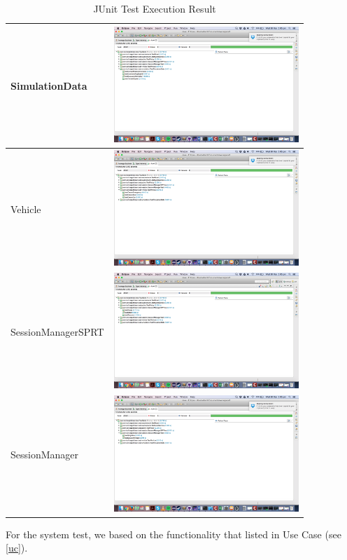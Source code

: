 \documentclass[11pt]{article}
\begin{document}
\begin{center}
\begin{table}[H]
\begin{tabular}{|m{7cm}|m{7cm}|}
		 SimulationData & \includegraphics[width=7cm]{TestSimulationData}\\ \hline
		 Vehicle & \includegraphics[width=7cm]{TestVehicle}\\ \hline
		 SessionManagerSPRT & \includegraphics[width=7cm]{SessionManagerSPRTest}\\ \hline
		 SessionManager & \includegraphics[width=7cm]{SessionManagerTest}\\ \hline
		
	\end{tabular}
	\caption{JUnit Test Execution Result}
		\label{table:JUnitTestingTable}
	\end{table}
\end{center}

For the system test, we based on the functionality that listed in Use Case (see \ref{uc}).
\end{document}
